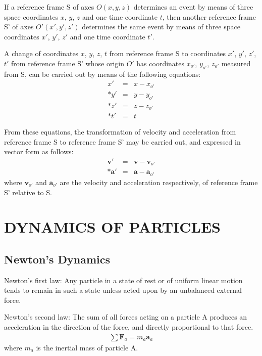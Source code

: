 \documentclass[12pt]{article}
\newcommand{\yT}{\bigskip}%
\newcommand{\cA}{\centering}%
\newcommand{\cT}{\cA\section}%
\newcommand{\cS}{\cA\subsection}%
\newcommand{\ct}[1]{}%
\newcommand{\cs}[1]{}%
\newcommand{\vA}{\mathbf{a}}
\newcommand{\vF}{\mathbf{F}}
\newcommand{\vV}{\mathbf{v}}
\newcommand{\mX}{x}
\newcommand{\mY}{y}
\newcommand{\mZ}{z}
\newcommand{\mT}{t}
\newcommand{\mM}{m}
\newcommand{\rt}{'}
\newcommand{\ra}{_a}
\newcommand{\rot}{_{o'}}
\begin{document}
\par If a reference frame S of axes $O(\mX,\mY,\mZ)$ determines an event by means of three space coordinates $\mX$, $\mY$, $\mZ$ and one time coordinate $\mT$, then another reference frame S' of axes $O\rt(\mX\rt,\mY\rt,\mZ\rt)$ determines the same event by means of three space coordinates $\mX\rt$, $\mY\rt$, $\mZ\rt$ and one time coordinate $\mT\rt$.
\par A change of coordinates $\mX$, $\mY$, $\mZ$, $\mT$ from reference frame S to coordinates $\mX\rt$, $\mY\rt$, $\mZ\rt$, $\mT\rt$ from reference frame S' whose origin $O\rt$ has coordinates $\mX\rot$, $\mY\rot$, $\mZ\rot$ measured from S, can be carried out by means of the following equations:
\begin{eqnarray*}
\mX\rt & = & \mX - \mX\rot \\*
\mY\rt & = & \mY - \mY\rot \\*
\mZ\rt & = & \mZ - \mZ\rot \\*
\mT\rt & = & \mT
\end{eqnarray*}
\par From these equations, the transformation of velocity and acceleration from reference frame S to reference frame S' may be carried out, and expressed in vector form as follows:
\begin{eqnarray*}
\vV\rt & = & \vV - \vV\rot \\*
\vA\rt & = & \vA - \vA\rot
\end{eqnarray*}
\noindent where $\vV\rot$ and $\vA\rot$ are the velocity and acceleration respectively, of reference frame S' relative to S.

\yT \vspace{0em}

{\ct{DYNAMICS OF PARTICLES}}
{\cT{DYNAMICS OF PARTICLES}}

{\cs{Newton's Dynamics}}
{\cS{Newton's Dynamics}}

\par Newton's first law: Any particle in a state of rest or of uniform linear motion tends to remain in such a state unless acted upon by an unbalanced external force.
\par Newton's second law: The sum of all forces acting on a particle A produces an acceleration in the direction of the force, and directly proportional to that force.
\begin{eqnarray*}
\sum \vF\ra = \mM\ra\vA\ra
\end{eqnarray*}
\noindent where $\mM\ra$ is the inertial mass of particle A.
\end{document}

